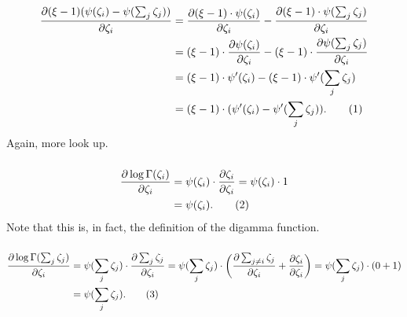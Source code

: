 \documentclass[12pt]{article}
\newcommand\numberthis{\addtocounter{equation}{1}\tag{\theequation}}
\begin{document}
\begin{align*}
    \frac{\partial (\xi - 1)(\psi(\zeta_{i}) - \psi(\sum_{j} \zeta_{j}))}
    {\partial \zeta_{i}}
    & =
    \frac{\partial (\xi-1)\cdot\psi(\zeta_{i})}{\partial \zeta_{i}} -
    \frac{\partial (\xi-1)\cdot\psi(\sum_{j} \zeta_{j})}{\partial \zeta_{i}}
    \\ & =
    (\xi-1)\cdot\frac{\partial \psi(\zeta_{i})}{\partial \zeta_{i}} -
    (\xi-1)\cdot\frac{\partial \psi(\sum_{j}\zeta_{j})}{\partial \zeta_{i}}
    \\ & =
    (\xi-1)\cdot\psi'(\zeta_{i}) - (\xi-1)\cdot\psi'(\sum_{j}\zeta_{j})
    \\ & =
    (\xi-1)\cdot(\psi'(\zeta_{i}) - \psi'(\sum_{j} \zeta_{j})).
    \numberthis
    \end{align*}
Again, more look up.

\subsubsection{}

\begin{align*}
    \frac{\partial \log \Gamma(\zeta_{i})}{\partial \zeta_{i}}
    & =
    \psi(\zeta_{i}) \cdot \frac{\partial \zeta_{i}}{\partial \zeta_{i}}
    =
    \psi(\zeta_{i}) \cdot 1
    \\ &=
    \psi(\zeta_{i}).
    \numberthis
\end{align*}
Note that this is, in fact, the definition of the digamma function.

\subsubsection{}

\begin{align*}
    \frac{\partial \log \Gamma(\sum_{j}\zeta_{j})}{\partial \zeta_{i}}
    & =
    \psi(\sum_{j}\zeta_{j}) \cdot
    \frac{\partial \sum_{j}\zeta_{j}}{\partial \zeta_{i}}
    =
    \psi(\sum_{j}\zeta_{j}) \cdot \left(\frac{\partial \sum_{j\neq i}\zeta_{j}}
    {\partial \zeta_{i}} + \frac{\partial \zeta_{i}}{\partial \zeta_{i}}\right)
    =
    \psi(\sum_{j}\zeta_{j}) \cdot (0 + 1)
    \\ &=
    \psi(\sum_{j}\zeta_{j}).
    \numberthis
\end{align*}

\subsubsection{}
\end{document}
